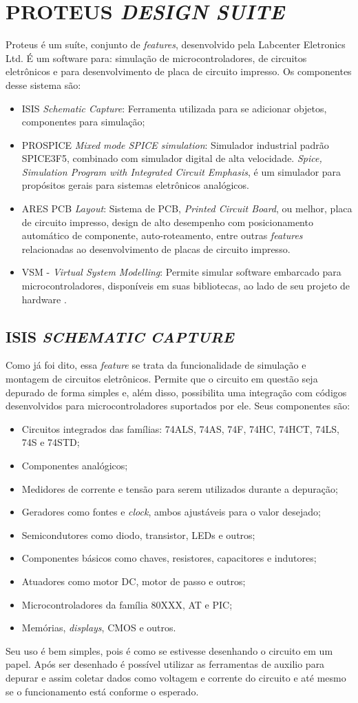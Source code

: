 \section{PROTEUS \emph{DESIGN SUITE}}
Proteus é um suíte, conjunto de \emph{features}, desenvolvido pela Labcenter Eletronics Ltd. É um software para: simulação de microcontroladores, de circuitos eletrônicos e para desenvolvimento de placa de circuito impresso. Os componentes desse sistema são:
\begin{itemize}
\item ISIS \emph{Schematic Capture}: Ferramenta utilizada para se adicionar objetos, componentes para simulação;
\item PROSPICE \emph{Mixed mode SPICE simulation}: Simulador industrial padrão SPICE3F5, combinado com simulador digital de alta velocidade. \emph{Spice, Simulation Program with Integrated Circuit Emphasis}, é um simulador para propósitos gerais para sistemas eletrônicos analógicos.
\item ARES PCB \emph{Layout}: Sistema de PCB, \emph{Printed Circuit Board}, ou melhor, placa de circuito impresso, design de alto desempenho com posicionamento automático de componente, auto-roteamento, entre outras \emph{features} relacionadas ao desenvolvimento de placas de circuito impresso.
\item VSM - \emph{Virtual System Modelling}: Permite simular software embarcado para microcontroladores, disponíveis em suas bibliotecas, ao lado de seu projeto de hardware \cite{proteus2013, wikipedia2012spice}.
\end{itemize}

\subsection{ISIS \emph{SCHEMATIC CAPTURE}}
Como já foi dito, essa \emph{feature} se trata da funcionalidade de simulação e montagem de circuitos eletrônicos. Permite que o circuito em questão seja depurado de forma simples e, além disso, possibilita uma integração com códigos desenvolvidos para microcontroladores suportados por ele. Seus componentes são:

\begin{itemize}
\item Circuitos integrados das famílias: 74ALS, 74AS, 74F, 74HC, 74HCT, 74LS, 74S e 74STD;
\item Componentes analógicos;
\item Medidores de corrente e tensão para serem utilizados durante a depuração;
\item Geradores como fontes e \emph{clock}, ambos ajustáveis para o valor desejado;
\item Semicondutores como diodo, transistor, LEDs e outros;
\item Componentes básicos como chaves, resistores, capacitores e indutores;
\item Atuadores como motor DC, motor de passo e outros;
\item Microcontroladores da família 80XXX, AT e PIC;
\item Memórias, \emph{displays}, CMOS e outros.
\end{itemize}

Seu uso é bem simples, pois é como se estivesse desenhando o circuito em um papel. Após ser desenhado é possível utilizar as ferramentas de auxilio para depurar e assim coletar dados como voltagem e corrente do circuito e até mesmo se o funcionamento está conforme o esperado.